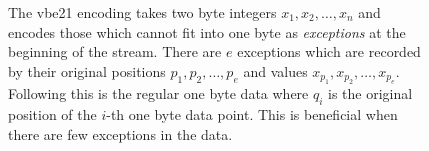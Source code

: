 \begin{figure}
\centering{}
	\caption{\label{fig:vbe21} The vbe21 encoding takes two byte integers
	$x_1,x_2,\dots,x_n$ and encodes those which cannot fit into one byte as
	\textit{exceptions} at the beginning of the stream. There are $e$
	exceptions which are recorded by their original positions
	$p_1,p_2,\dots,p_e$ and values $x_{p_1},x_{p_2},\dots,x_{p_e}$.
	Following this is the regular one byte data where $q_i$ is the original
	position of the $i$-th one byte data point. This is beneficial when
	there are few exceptions in the data.}
\end{figure}
